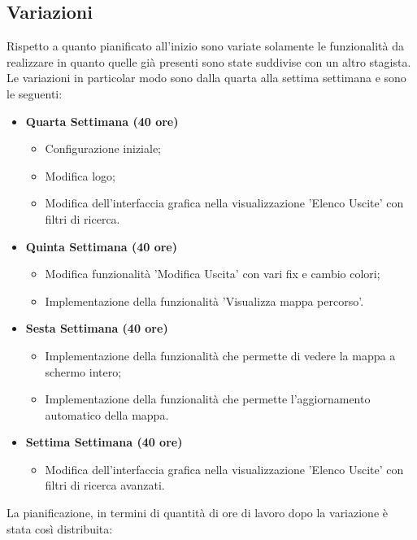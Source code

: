 \subsection{Variazioni}
Rispetto a quanto pianificato all'inizio sono variate solamente le funzionalità da realizzare in quanto quelle già presenti sono state suddivise con un altro stagista.
Le variazioni in particolar modo sono dalla quarta alla settima settimana e sono le seguenti:
\begin{itemize}
\item \textbf{Quarta Settimana (40 ore)} 
\begin{itemize}
	\item Configurazione iniziale;
	\item Modifica logo;
	\item Modifica dell'interfaccia grafica nella visualizzazione 'Elenco Uscite' con filtri di ricerca.
\end{itemize}
\item \textbf{Quinta Settimana (40 ore)} 
\begin{itemize}
	\item Modifica funzionalità 'Modifica Uscita' con vari fix e cambio colori;
	\item Implementazione della funzionalità 'Visualizza mappa percorso'.
\end{itemize}
\item \textbf{Sesta Settimana (40 ore)} 
\begin{itemize}
	\item Implementazione della funzionalità che permette di vedere la mappa a schermo intero;
	\item Implementazione della funzionalità che permette l'aggiornamento automatico della mappa.
\end{itemize}
\item \textbf{Settima Settimana (40 ore)} 
\begin{itemize}
	\item Modifica dell'interfaccia grafica nella visualizzazione 'Elenco Uscite' con filtri di ricerca avanzati.
\end{itemize}
\end{itemize}
La pianificazione, in termini di quantità di ore di lavoro dopo la variazione è stata così distribuita:
